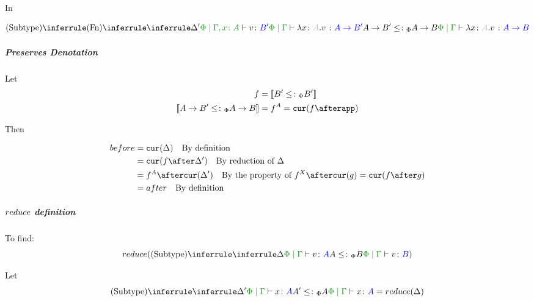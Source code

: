 \documentclass{report}
\begin{document}
                In

                \begin{equation}
                    \ntreeruleII{Subtype}{
                        \ntreeruleI{Fn}{
                            \treeruleI{
                                \D'
                            }{
                                \etyperelation{\P}{\gax}{v}{B'}
                            }    
                        }{
                            \gpetyperelation{\lam{x}{A}{v}}{\fntype{A}{B'}}
                        }
                        }{
                        \fntype{A}{B'}\subtypep\fntype{A}{B}
                    } {
                        \gpetyperelation{\lam{x}{A}{v}}{\fntype{A}{B}}
                    }
                \end{equation}

            \subparagraph{Preserves Denotation}
                Let
                \begin{align*}
                    f &= \deno{B'\subtypep B'} \\
                    \deno{\fntype{A}{B'}\subtypep\fntype{A}{B}} & = f^A = \cur{f\after \app}
                \end{align*}

                Then

                \begin{align*}
                    before & = \cur{\D} \qt{By definition}\\
                            & = \cur{f\after\D'} \qt{By reduction of $\D$} \\
                            & = f^A\after\cur{\D'}\qt{By the property of $f^X\after\cur{g} = \cur{f\after g}$} \\
                            & = after \qt{By definition}\\
                \end{align*}

            \subparagraph{$reduce$ definition}
            To find:
            \begin{equation}
                \reduce(\ntreeruleII{Subtype}{\treeruleI{\D}{\gpetyperelation{v}{A}}}{ A \subtypep B}{\gpetyperelation{v}{B}})
            \end{equation}

            Let 
            \begin{equation}\label{SubtypeDeltaReduction}
                \ntreeruleII{Subtype}{\treeruleI{\D'}{\gpetyperelation{x}{A}}}{ A'\subtypep A}{\gpetyperelation{x}{A}} = \reduce(\D)
            \end{equation}
\end{document}
